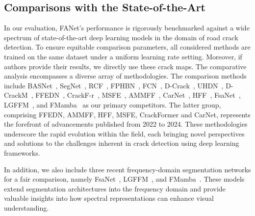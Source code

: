 \documentclass[journal]{IEEEtran}
\begin{document}











\subsection{Comparisons with the State-of-the-Art}

In our evaluation, FANet's performance is rigorously benchmarked against a wide spectrum of state-of-the-art deep learning models in the domain of road crack detection. To ensure equitable comparison parameters, all considered methods are trained on the same dataset under a uniform learning rate setting. Moreover, if authors provide their results, we directly use these crack maps. The comparative analysis encompasses a diverse array of methodologies. The comparison methods include BASNet~\cite{DBLP:conf/cvpr/QinZHGDJ19}, 
SegNet~\cite{DBLP:journals/corr/BadrinarayananK15}, 
RCF~\cite{DBLP:conf/cvpr/LiuCHWB17}, 
FPHBN~\cite{DBLP:journals/tits/YangZYPML20}, 
FCN~\cite{DBLP:conf/cvpr/LongSD15}, 
D-Crack~\cite{DBLP:journals/tip/ZouZLQWW19}, 
UHDN~\cite{DBLP:journals/corr/abs-2007-00477}, 
D-CrackM~\cite{DBLP:journals/ijon/LiuYLXL19}, 
FFEDN~\cite{DBLP:journals/tits/LiuZXZL22}, 
CrackF-r~\cite{DBLP:journals/tits/LiuYMMK23}, 
MSFE~\cite{DBLP:journals/tiv/ZhouQJ23}, 
AMMFF~\cite{DBLP:journals/tits/QuCWYL22}, 
CarNet~\cite{DBLP:journals/tits/LiYMWWTQ24}, 
HFF~\cite{DBLP:journals/tits/QuWWJ22}, 
FsaNet~\cite{DBLP:journals/tip/ZhangPG23}, 
LGFFM~\cite{11129883TMI}, 
and FMamba~\cite{DBLP:journals/tim/LiuLLWZS25} as our primary competitors.
The latter group, comprising FFEDN, AMMFF, HFF, MSFE, CrackFormer and CarNet, represents the forefront of advancements published from 2022 to 2024. These methodologies underscore the rapid evolution within the field, each bringing novel perspectives and solutions to the challenges inherent in crack detection using deep learning frameworks.

%
%

\par

In addition, we also include three recent frequency-domain segmentation networks for a fair comparison, 
namely FsaNet~\cite{DBLP:journals/tip/ZhangPG23}, 
LGFFM~\cite{11129883TMI}, 
and FMamba~\cite{DBLP:journals/tim/LiuLLWZS25}. 
These models extend segmentation architectures into the frequency domain and provide valuable insights into how spectral representations can enhance visual understanding.
\end{document}
